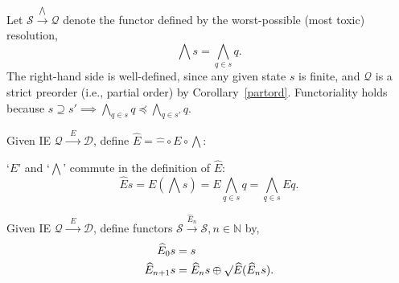 \documentclass{article}
\newcommand{\N}{\mathbb{N}}
\newcommand{\IE}{\ensuremath{\mathcal{Q} \xrightarrow{\;\;E\;\;} \mathcal{D}}}
\newcommand{\E}{\ensuremath{\widehat{E}}}
\begin{document}
\begin{nota}
  Let $\mathcal{S} \xrightarrow{\bigwedge} \mathcal{Q}$ denote the functor defined by the worst-possible (most toxic) resolution,
  $$
  \bigwedge s = \bigwedge_{q \in s} q.
  $$
  The right-hand side is well-defined, since any given state $s$ is finite, and $\mathcal{Q}$ is a strict preorder (i.e., partial order) by Corollary~\ref{partord}.  Functoriality holds because $s \supseteq s' \implies \bigwedge_{q \in s} q \preceq \bigwedge_{q \in s'} q$.
\end{nota}


\begin{nota}
  Given IE $\IE$, define $\E = \widehat{-} \circ E \circ \bigwedge$:
  \begin{center}
  \end{center}
\end{nota}

\begin{fact}
  `$E$' and `$\bigwedge$\!' commute in the definition of $\E$:
  $$
  \E s = E \left(\bigwedge s\right) = E \bigwedge_{q \in s} q = \bigwedge_{q \in s} E q.
  $$
\end{fact}

\begin{nota}\label{altmutrec}
  Given IE $\mathcal{Q} \xrightarrow{\;\;E\;\;} \mathcal{D}$, define functors $\mathcal{S} \xrightarrow{\E_n} \mathcal{S}, n \in \N$ by,
  $$
  \begin{aligned}
    \E_0 s &= s \\
    \E_{n+1} s &= \E_n s \oplus \surd\E(\E_n s).
  \end{aligned}
  $$
\end{nota}
\end{document}
